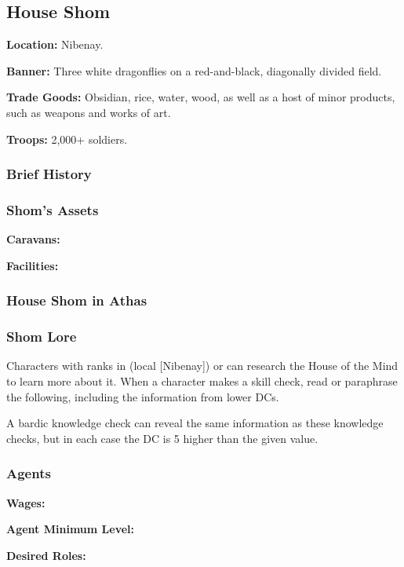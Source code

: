 \subsection{House Shom}
\textbf{Location:} Nibenay.

\textbf{Banner:} Three white dragonflies on a red-and-black, diagonally divided field.

\textbf{Trade Goods:} Obsidian, rice, water, wood, as well as a host of minor
products, such as weapons and works of art.

\textbf{Troops:} 2,000+ soldiers.

\subsubsection{Brief History}

\subsubsection{Shom's Assets}

\textbf{Caravans:} 

\textbf{Facilities:} 

\subsubsection{House Shom in Athas}

\subsubsection{Shom Lore}
Characters with ranks in  (local [Nibenay]) or  can research the House of the Mind to learn more about it. When a character makes a skill check, read or paraphrase the following, including the information from lower DCs.


A bardic knowledge check can reveal the same information as these knowledge checks, but in each case the DC is 5 higher than the given value.

\subsubsection{Agents}

\textbf{Wages:} 

\textbf{Agent Minimum Level:} 

\textbf{Desired Roles:} 